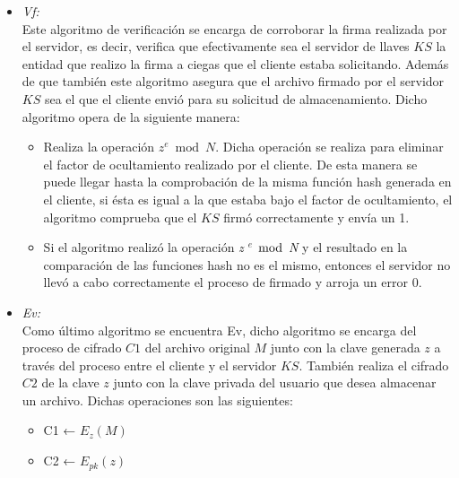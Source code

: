 \begin{itemize}
\item \textit{Vf: }\\

Este algoritmo de verificación se encarga de corroborar la firma realizada por el servidor, es decir, verifica que efectivamente sea el servidor de llaves $KS$ la entidad que realizo la firma a ciegas que el cliente estaba solicitando. Además de que también este algoritmo asegura que el archivo firmado por el servidor $KS$ sea el que el cliente envió para su solicitud de almacenamiento. 
Dicho algoritmo opera de la siguiente manera: 
\begin{itemize}
\item Realiza la operación $z^e \bmod N $. Dicha operación se realiza para eliminar el factor de ocultamiento realizado por el cliente. De esta manera se puede llegar hasta la comprobación de la misma función hash generada en el cliente, si ésta es igual a la que estaba bajo el factor de ocultamiento, el algoritmo comprueba que el $KS$ firmó correctamente y envía un 1. 
\item Si el algoritmo realizó la operación \textit{z $^e$ $\bmod$ N} y el resultado en la comparación de las funciones hash no es el mismo, entonces el servidor no llevó a cabo correctamente el proceso de firmado y arroja un error 0. 

\end{itemize}

\item \textit{Ev: }\\
Como último algoritmo se encuentra Ev, dicho algoritmo se encarga del proceso de cifrado $C1$ del archivo original $M$ junto con la clave generada $z$ a través del proceso entre el cliente y el servidor $KS$. También realiza el cifrado $C2$ de la clave $z$ junto con la clave privada del usuario que desea almacenar un archivo. Dichas operaciones son las siguientes: 

\begin{itemize}
\item C1 ← $E_{z}(M)$
\item C2 ← $E_{pk}(z)$
\end{itemize}


\end{itemize}







